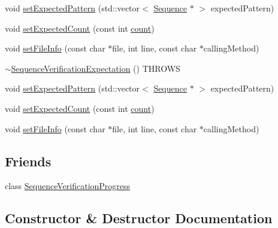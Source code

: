 \begin{DoxyCompactItemize}
\item 
void \mbox{\hyperlink{structfakeit_1_1SequenceVerificationExpectation_acf31012cd30a4213e3fb927549525c7d}{set\+Expected\+Pattern}} (std\+::vector$<$ \mbox{\hyperlink{classfakeit_1_1Sequence}{Sequence}} $\ast$ $>$ expected\+Pattern)
\item 
void \mbox{\hyperlink{structfakeit_1_1SequenceVerificationExpectation_aeb5a9670fec5f1c6174bd5206074d428}{set\+Expected\+Count}} (const int \mbox{\hyperlink{gmock__stress__test_8cc_afd9db40e3361ae09188795e8cbe19752}{count}})
\item 
void \mbox{\hyperlink{structfakeit_1_1SequenceVerificationExpectation_af6ca6f44173d64798ddc99d494c40c2f}{set\+File\+Info}} (const char $\ast$file, int line, const char $\ast$calling\+Method)
\item 
\mbox{\hyperlink{structfakeit_1_1SequenceVerificationExpectation_a2378bd3fa4b42806ced08be01261d9ab}{$\sim$\+Sequence\+Verification\+Expectation}} () T\+H\+R\+O\+WS
\item 
void \mbox{\hyperlink{structfakeit_1_1SequenceVerificationExpectation_acf31012cd30a4213e3fb927549525c7d}{set\+Expected\+Pattern}} (std\+::vector$<$ \mbox{\hyperlink{classfakeit_1_1Sequence}{Sequence}} $\ast$ $>$ expected\+Pattern)
\item 
void \mbox{\hyperlink{structfakeit_1_1SequenceVerificationExpectation_aeb5a9670fec5f1c6174bd5206074d428}{set\+Expected\+Count}} (const int \mbox{\hyperlink{gmock__stress__test_8cc_afd9db40e3361ae09188795e8cbe19752}{count}})
\item 
void \mbox{\hyperlink{structfakeit_1_1SequenceVerificationExpectation_af6ca6f44173d64798ddc99d494c40c2f}{set\+File\+Info}} (const char $\ast$file, int line, const char $\ast$calling\+Method)
\end{DoxyCompactItemize}
\subsection*{Friends}
\begin{DoxyCompactItemize}
\item 
class \mbox{\hyperlink{structfakeit_1_1SequenceVerificationExpectation_ae2372c6e6c2001b2f93e4f78e6bdfabc}{Sequence\+Verification\+Progress}}
\end{DoxyCompactItemize}


\subsection{Constructor \& Destructor Documentation}
\mbox{\label{structfakeit_1_1SequenceVerificationExpectation_a2378bd3fa4b42806ced08be01261d9ab}} 
